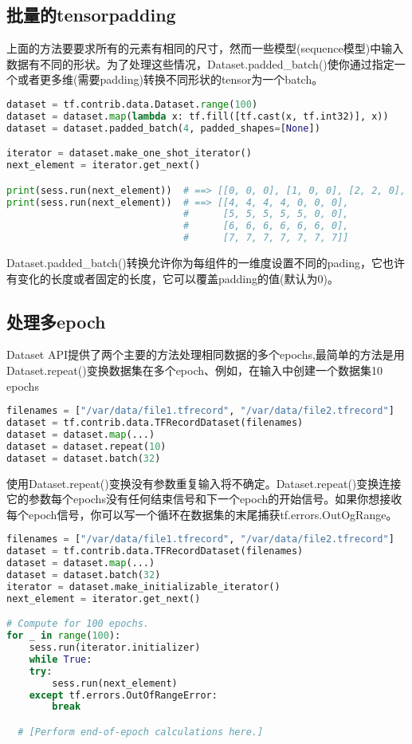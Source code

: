 \subsection{批量的tensorpadding}
上面的方法要要求所有的元素有相同的尺寸，然而一些模型(sequence模型)中输入数据有不同的形状。为了处理这些情况，Dataset.padded\_batch()使你通过指定一个或者更多维(需要padding)转换不同形状的tensor为一个batch。
\begin{lstlisting}[language=Python]
dataset = tf.contrib.data.Dataset.range(100)
dataset = dataset.map(lambda x: tf.fill([tf.cast(x, tf.int32)], x))
dataset = dataset.padded_batch(4, padded_shapes=[None])

iterator = dataset.make_one_shot_iterator()
next_element = iterator.get_next()

print(sess.run(next_element))  # ==> [[0, 0, 0], [1, 0, 0], [2, 2, 0], [3, 3, 3]]
print(sess.run(next_element))  # ==> [[4, 4, 4, 4, 0, 0, 0],
                               #      [5, 5, 5, 5, 5, 0, 0],
                               #      [6, 6, 6, 6, 6, 6, 0],
                               #      [7, 7, 7, 7, 7, 7, 7]]
\end{lstlisting}
Dataset.padded\_batch()转换允许你为每组件的一维度设置不同的pading，它也许有变化的长度或者固定的长度，它可以覆盖padding的值(默认为0)。
\subsection{处理多epoch}
Dataset API提供了两个主要的方法处理相同数据的多个epochs,最简单的方法是用Dataset.repeat()变换数据集在多个epoch、例如，在输入中创建一个数据集10 epochs
\begin{lstlisting}[language=Python]
filenames = ["/var/data/file1.tfrecord", "/var/data/file2.tfrecord"]
dataset = tf.contrib.data.TFRecordDataset(filenames)
dataset = dataset.map(...)
dataset = dataset.repeat(10)
dataset = dataset.batch(32)
\end{lstlisting}
使用Dataset.repeat()变换没有参数重复输入将不确定。Dataset.repeat()变换连接它的参数每个epochs没有任何结束信号和下一个epoch的开始信号。如果你想接收每个epoch信号，你可以写一个循环在数据集的末尾捕获tf.errors.OutOgRange。
\begin{lstlisting}[language=Python]
filenames = ["/var/data/file1.tfrecord", "/var/data/file2.tfrecord"]
dataset = tf.contrib.data.TFRecordDataset(filenames)
dataset = dataset.map(...)
dataset = dataset.batch(32)
iterator = dataset.make_initializable_iterator()
next_element = iterator.get_next()

# Compute for 100 epochs.
for _ in range(100):
    sess.run(iterator.initializer)
    while True:
    try:
        sess.run(next_element)
    except tf.errors.OutOfRangeError:
        break

  # [Perform end-of-epoch calculations here.]
\end{lstlisting}

